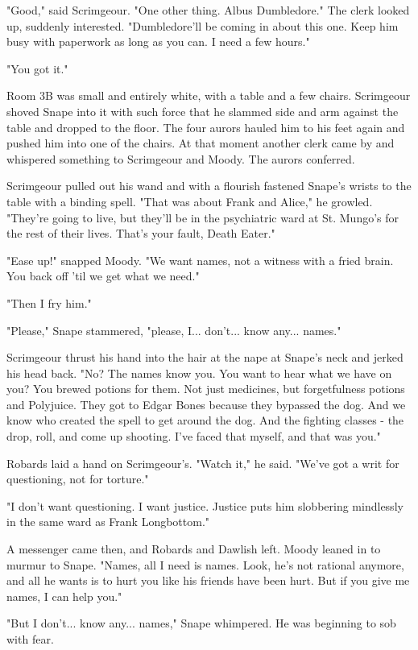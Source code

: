 "Good," said Scrimgeour. "One other thing. Albus Dumbledore." The clerk looked up, suddenly interested. "Dumbledore'll be coming in about this one. Keep him busy with paperwork as long as you can. I need a few hours."

"You got it."

Room 3B was small and entirely white, with a table and a few chairs. Scrimgeour shoved Snape into it with such force that he slammed side and arm against the table and dropped to the floor. The four aurors hauled him to his feet again and pushed him into one of the chairs. At that moment another clerk came by and whispered something to Scrimgeour and Moody. The aurors conferred.

Scrimgeour pulled out his wand and with a flourish fastened Snape's wrists to the table with a binding spell. "That was about Frank and Alice," he growled. "They're going to live, but they'll be in the psychiatric ward at St. Mungo's for the rest of their lives. That's your fault, Death Eater."

"Ease up!" snapped Moody. "We want names, not a witness with a fried brain. You back off 'til we get what we need."

"Then I fry him."

"Please," Snape stammered, "please, I... don't... know any... names."

Scrimgeour thrust his hand into the hair at the nape at Snape's neck and jerked his head back. "No? The names know you. You want to hear what we have on you? You brewed potions for them. Not just medicines, but forgetfulness potions and Polyjuice. They got to Edgar Bones because they bypassed the dog. And we know who created the spell to get around the dog. And the fighting classes - the drop, roll, and come up shooting. I've faced that myself, and that was you."

Robards laid a hand on Scrimgeour's. "Watch it," he said. "We've got a writ for questioning, not for torture."

"I don't want questioning. I want justice. Justice puts him slobbering mindlessly in the same ward as Frank Longbottom."

A messenger came then, and Robards and Dawlish left. Moody leaned in to murmur to Snape. "Names, all I need is names. Look, he's not rational anymore, and all he wants is to hurt you like his friends have been hurt. But if you give me names, I can help you."

"But I don't... know any... names," Snape whimpered. He was beginning to sob with fear.

